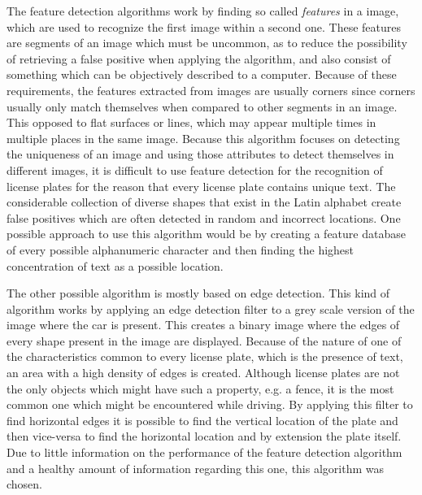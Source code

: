 The feature detection algorithms work by finding so called \emph{features} in a image, which are used to recognize the first image within a second one. These features are segments of an image which must be uncommon, as to reduce the possibility of retrieving a false positive when applying the algorithm, and also consist of something which can be objectively described to a computer. Because of these requirements, the features extracted from images are usually corners since corners usually only match themselves when compared to other segments in an image. This opposed to flat surfaces or lines, which may appear multiple times in multiple places in the same image. Because this algorithm focuses on detecting the uniqueness of an image and using those attributes to detect themselves in different images, it is difficult to use feature detection for the recognition of license plates for the reason that every license plate contains unique text. The considerable collection of diverse shapes that exist in the Latin alphabet create false positives which are often detected in random and incorrect locations. One possible approach to use this algorithm would be by creating a feature database of every possible alphanumeric character and then finding the highest concentration of text as a possible location. 

The other possible algorithm is mostly based on edge detection. This kind of algorithm works by applying an edge detection filter to a grey scale version of the image where the car is present. This creates a binary image where the edges of every shape present in the image are displayed. Because of the nature of one of the characteristics common to every license plate, which is the presence of text, an area with a high density of edges is created. Although license plates are not the only objects which might have such a property, e.g. a fence, it is the most common one which might be encountered while driving. By applying this filter to find horizontal edges it is possible to find the vertical location of the plate and then vice-versa to find the horizontal location and by extension the plate itself. Due to little information on the performance of the feature detection algorithm and a healthy amount of information regarding this one, this algorithm was chosen.


